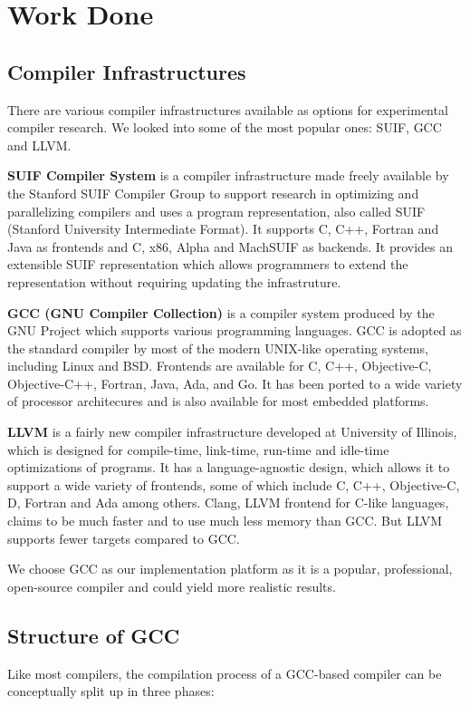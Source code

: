 \chapter{Work Done}

\section{Compiler Infrastructures}
There are various compiler infrastructures available as options for experimental compiler research. We looked into some of the most popular ones: SUIF, GCC and LLVM.

\textbf{SUIF Compiler System}\cite{suif} is a compiler infrastructure made freely available by the Stanford SUIF Compiler Group to support research in optimizing and parallelizing compilers and uses a program representation, also called SUIF (Stanford University Intermediate Format). It supports C, C++, Fortran and Java as frontends and C, x86, Alpha and MachSUIF as backends. It provides an extensible SUIF representation which allows programmers to extend the representation without requiring updating the infrastruture.

\textbf{GCC (GNU Compiler Collection)}\cite{gcc} is a compiler system produced by the GNU Project which supports various programming languages. GCC is adopted as the standard compiler by most of the modern UNIX-like operating systems, including Linux and BSD. Frontends are available for C, C++, Objective-C, Objective-C++, Fortran, Java, Ada, and Go. It has been ported to a wide variety of processor architecures and is also available for most embedded platforms.

\textbf{LLVM}\cite{llvm} is a fairly new compiler infrastructure developed at University of Illinois, which is designed for compile-time, link-time, run-time and idle-time optimizations of programs. It has a language-agnostic design, which allows it to support a wide variety of frontends, some of which include C, C++, Objective-C, D, Fortran and Ada among others. Clang, LLVM frontend for C-like languages, claims to be much faster and to use much less memory than GCC\cite{clang}. But LLVM supports fewer targets compared to GCC.

We choose GCC as our implementation platform as it is a popular, professional, open-source compiler and could yield more realistic results.

\section{Structure of GCC}
Like most compilers, the compilation process of a GCC-based compiler can be conceptually split up in three phases\cite{gcc-structure}:

